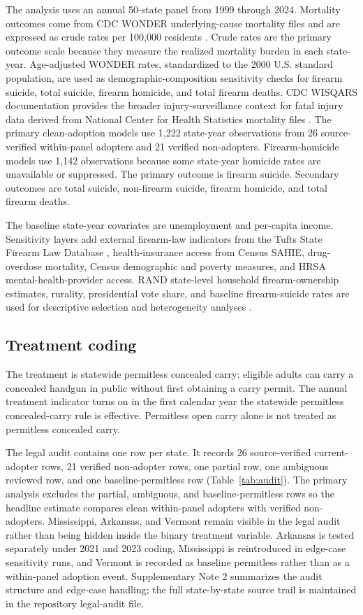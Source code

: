 \documentclass[11pt]{article}
\begin{document}
The analysis uses an annual 50-state panel from 1999 through 2024. Mortality outcomes come from CDC WONDER underlying-cause mortality files and are expressed as crude rates per 100,000 residents \citep{cdcWonder}. Crude rates are the primary outcome scale because they measure the realized mortality burden in each state-year. Age-adjusted WONDER rates, standardized to the 2000 U.S. standard population, are used as demographic-composition sensitivity checks for firearm suicide, total suicide, firearm homicide, and total firearm deaths. CDC WISQARS documentation provides the broader injury-surveillance context for fatal injury data derived from National Center for Health Statistics mortality files \citep{cdcWisqars}. The primary clean-adoption models use 1,222 state-year observations from 26 source-verified within-panel adopters and 21 verified non-adopters. Firearm-homicide models use 1,142 observations because some state-year homicide rates are unavailable or suppressed. The primary outcome is firearm suicide. Secondary outcomes are total suicide, non-firearm suicide, firearm homicide, and total firearm deaths.

The baseline state-year covariates are unemployment and per-capita income. Sensitivity layers add external firearm-law indicators from the Tufts State Firearm Law Database \citep{tuftsFirearmLaws}, health-insurance access from Census SAHIE, drug-overdose mortality, Census demographic and poverty measures, and HRSA mental-health-provider access. RAND state-level household firearm-ownership estimates, rurality, presidential vote share, and baseline firearm-suicide rates are used for descriptive selection and heterogeneity analyses \citep{randOwnership}.

\subsection*{Treatment coding}

The treatment is statewide permitless concealed carry: eligible adults can carry a concealed handgun in public without first obtaining a carry permit. The annual treatment indicator turns on in the first calendar year the statewide permitless concealed-carry rule is effective. Permitless open carry alone is not treated as permitless concealed carry.

The legal audit contains one row per state. It records 26 source-verified current-adopter rows, 21 verified non-adopter rows, one partial row, one ambiguous reviewed row, and one baseline-permitless row (Table~\ref{tab:audit}). The primary analysis excludes the partial, ambiguous, and baseline-permitless rows so the headline estimate compares clean within-panel adopters with verified non-adopters. Mississippi, Arkansas, and Vermont remain visible in the legal audit rather than being hidden inside the binary treatment variable. Arkansas is tested separately under 2021 and 2023 coding, Mississippi is reintroduced in edge-case sensitivity runs, and Vermont is recorded as baseline permitless rather than as a within-panel adoption event. Supplementary Note 2 summarizes the audit structure and edge-case handling; the full state-by-state source trail is maintained in the repository legal-audit file.
\end{document}
